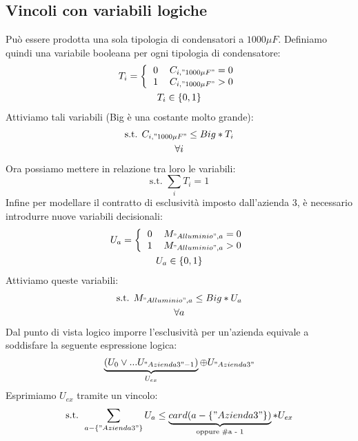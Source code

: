 \documentclass[11pt,a4paper]{article}
\begin{document}
\subsection{Vincoli con variabili logiche}
Può essere prodotta una sola tipologia di condensatori a $1000 \mu F$. Definiamo quindi una variabile booleana per ogni tipologia di condensatore: \\
\begin{gather*}
T_{i}=\left \{
\begin{tabular}{cc}
0 & $C_{i,"1000 \mu F"} = 0$ \\
1 & $C_{i,"1000 \mu F"} >0$
\end{tabular}
\right. \\
T_{i} \in \{ 0,1\}
\end{gather*}
Attiviamo tali variabili (Big è una costante molto grande): \\
\begin{gather*}
\text{s.t. } C_{i,"1000 \mu F"} \leq Big*T_{i} \\
\forall i
\end{gather*}
Ora possiamo mettere in relazione tra loro le variabili: \\
\begin{equation}
\text{s.t. } \sum_{i} T_{i} =1
\end{equation}
Infine per modellare il contratto di esclusività imposto dall'azienda 3, è necessario introdurre nuove variabili decisionali:
\begin{gather*}
U_{a}=\left \{
\begin{tabular}{cc}
0 & $M_{"Alluminio",a} = 0$ \\
1 & $M_{"Alluminio",a} >0$
\end{tabular}
\right. \\
U_{a} \in \{ 0,1\}
\end{gather*}
Attiviamo queste variabili:
\begin{gather*}
\text{s.t. } M_{"Alluminio",a} \leq Big*U_{a} \\
\forall a
\end{gather*}
Dal punto di vista logico imporre l'esclusività per un'azienda equivale a soddisfare la seguente espressione logica: \\
\begin{equation}
\underbrace{(U_{0} \lor ... U_{"Azienda 3"-1})}_{U_{ex}} \oplus U_{"Azienda 3"}
\end{equation}
Esprimiamo $U_{ex}$ tramite un vincolo: \\
\begin{equation}
\text{s.t. } \sum_{a-\{"Azienda 3"\}} U_{a} \leq \underbrace{card(a-\{"Azienda 3"\})}_{\text{oppure \#a - 1}}*U_{ex}
\end{equation}
\end{document}
